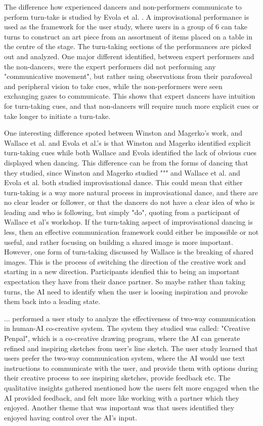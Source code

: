 \documentclass[final,5p,times,twocolumn,authoryear]{article}
\begin{document}
The difference how experienced dancers and non-performers communicate
to perform turn-take is studied by Evola et al. \cite{Evola}. 
A improvisational performance is used as the framework for the user
study, where users in a group of 6 can take turns to construct an art
piece from an assortment of items placed on a table in the centre of the
stage. The turn-taking sections of the performances are picked out and analyzed.
One major different identified, between expert performers and the
non-dancers, were the expert performers did not performing any "communicative
movement", but rather using observations from their parafoveal and peripheral
vision to take cues, while the non-performers were seen exchanging gazes to
communicate. This shows that expert dancers have intuition for
turn-taking cues, and that non-dancers will require much more explicit cues
or take longer to initiate a turn-take.

One interesting difference spoted between Winston and Magerko's work, and
Wallace et al. and Evola et al.'s is that Winston and Magerko identified explicit
turn-taking cues while both Wallace and Evola identified the lack of
obvious cues displayed when dancing. This difference can be from the
forms of dancing that they studied, since Winston and Magerko studied
""" and Wallace et al. and Evola et al. both studied improvisational
dance. This could mean that either turn-taking is a way more natural
process in improvisational dance, and there are no clear leader or
follower, or that the dancers do not have a clear idea of who is leading
and who is following, but simply "do", quoting from a participant of
Wallace et al's workshop. If the turn-taking aspect of improvisational
dancing is less, then an effective communication framework could either
be impossible or not useful, and rather focusing on building a shared
image is more important. However, one form of turn-taking discussed
by Wallace is the breaking of shared images. This is the process of
switching the direction of the creative work and starting in a new
direction. Participants idenfied this to being an important expectation
they have from their dance partner. So maybe rather than taking turns,
the AI need to identify when the user is loosing inspiration and provoke
them back into a leading state.

... performed a user study to analyze the effectiveness of two-way
communication in human-AI co-creative system. The system they studied
was called: "Creative Penpal", which is a co-creative drawing program,
where the AI can generate refined and inspiring sketches from user's
line sketch. The user study learned that users prefer the two-way
communication system, where the AI would use text instructions to
communicate with the user, and provide them with options during their
creative process to see inspiring sketches, provide feedback etc. The
qualitative insights gathered mentioned how the users felt more engaged
when the AI provided feedback, and felt more like working with a partner
which they enjoyed. Another theme that was important was that users
identified they enjoyed having control over the AI's input.
\end{document}
